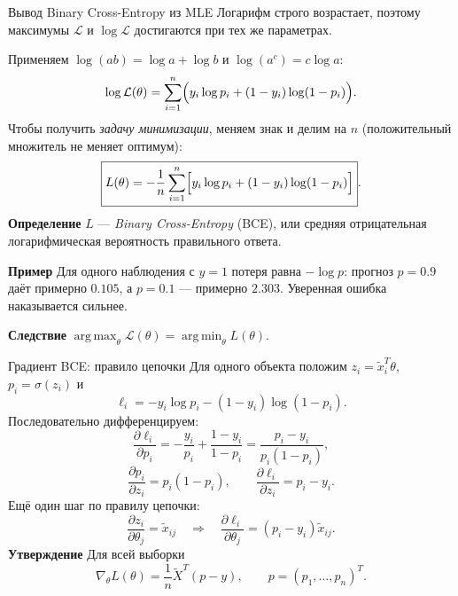 \documentclass[10pt]{beamer}
\newcommand{\mlBody}{\normalsize}
\newcommand{\mlDefinition}{\textcolor{defblue}{\bfseries Определение}}
\newcommand{\mlStatement}{\textcolor{defblue}{\bfseries Утверждение}}
\newcommand{\mlConsequence}{\textcolor{defblue}{\bfseries Следствие}}
\newcommand{\mlExample}{\textcolor{defblue}{\bfseries Пример}}
\begin{document}
\begin{frame}{Вывод Binary Cross-Entropy из MLE}
    \mlBody
    Логарифм строго возрастает, поэтому максимумы $\mathcal L$
    и $\log\mathcal L$ достигаются при тех же параметрах.

    Применяем $\log(ab)=\log a+\log b$ и $\log(a^c)=c\log a$:
    \[
       \log\mathcal L(\theta)
       =\sum_{i=1}^{n}\Bigl(y_i\log p_i
       +(1-y_i)\log(1-p_i)\Bigr).
    \]
    Чтобы получить \textit{задачу минимизации}, меняем знак и делим
    на $n$ (положительный множитель не меняет оптимум):
    \[
       \boxed{L(\theta)=-\frac1n\sum_{i=1}^{n}
       \Bigl[y_i\log p_i+(1-y_i)\log(1-p_i)\Bigr]}.
    \]
    \mlDefinition\; $L$ --- \textit{Binary Cross-Entropy} (BCE),
    или средняя отрицательная логарифмическая вероятность правильного ответа.

    \mlExample\; Для одного наблюдения с $y=1$ потеря равна $-\log p$:
    прогноз $p=0.9$ даёт примерно $0.105$, а $p=0.1$ --- примерно $2.303$.
    Уверенная ошибка наказывается сильнее.

    \mlConsequence\; $\operatorname*{arg\,max}_\theta\mathcal L(\theta)
    =\operatorname*{arg\,min}_\theta L(\theta)$.
\end{frame}

\begin{frame}{Градиент BCE: правило цепочки}
    \mlBody
    Для одного объекта положим $z_i=\widetilde x_i^T\theta$,
    $p_i=\sigma(z_i)$ и
    \[
       \ell_i=-y_i\log p_i-(1-y_i)\log(1-p_i).
    \]
    Последовательно дифференцируем:
    \[
       \frac{\partial\ell_i}{\partial p_i}
       =-\frac{y_i}{p_i}+\frac{1-y_i}{1-p_i}
       =\frac{p_i-y_i}{p_i(1-p_i)},
    \]
    \[
       \frac{\partial p_i}{\partial z_i}=p_i(1-p_i),
       \qquad
       \boxed{\frac{\partial\ell_i}{\partial z_i}=p_i-y_i}.
    \]
    Ещё один шаг по правилу цепочки:
    \[
       \frac{\partial z_i}{\partial\theta_j}=\widetilde x_{ij}
       \quad\Longrightarrow\quad
       \frac{\partial\ell_i}{\partial\theta_j}
       =(p_i-y_i)\widetilde x_{ij}.
    \]
    \mlStatement\; Для всей выборки
    \[
        \boxed{\nabla_\theta L(\theta)=\frac1n\widetilde X^T(p-y)},
        \qquad p=(p_1,\ldots,p_n)^T.
    \]
\end{frame}
\end{document}
